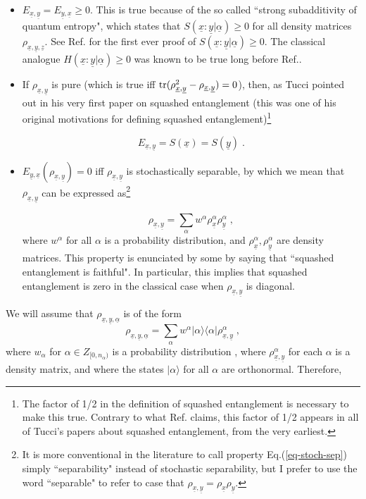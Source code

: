 \documentclass[12pt]{article}%
\newcommand{\bra}[1]{\langle#1|}
\newcommand{\ket}[1]{|#1\rangle}
\newcommand{\tr}[0]{{\rm tr }}
\newcommand{\beq}{\begin{equation}}
\newcommand{\eeq}{\end{equation}}
\newcommand{\ul}[1]{\underline{#1}}
\newcommand{\rvx}[0]{{\ul{x}}}
\newcommand{\rvy}[0]{{\ul{y}}}
\newcommand{\rvz}[0]{{\ul{z}}}
\newcommand{\rvalp}[0]{{\ul{\alpha}}}
\newcommand{\alp}[0]{{\alpha}}
\begin{document}
\begin{itemize}
\item
$E_{\rvx, \rvy} = E_{\rvy, \rvx}\geq 0$. This is true
because of the so called ``strong subadditivity
of quantum entropy", which states that
$S(\rvx : \rvy|\rvalp)\geq 0$
for all density matrices
$\rho_{\rvx,\rvy, \rvz}$.
See Ref.\cite{subadd-proof}
for the first ever proof of $S(\rvx : \rvy|\rvalp)\geq 0$.
The classical analogue $H(\rvx : \rvy|\rvalp)\geq 0$
was known to be true long before Ref.\cite{subadd-proof}.

\item
If $\rho_{\rvx, \rvy}$ is pure (which is true iff
$\tr( \rho_{\rvx, \rvy}^2 - \rho_{\rvx, \rvy}) = 0$), then, as
Tucci pointed out in his very first paper on squashed entanglement 
(this was one of his original motivations
for defining squashed entanglement)\footnote{ The factor of 1/2 in
the definition of squashed entanglement
is necessary to make this true.
Contrary to what Ref.\cite{sep-proof2} claims,
this factor
of 1/2 appears in all of Tucci's
 papers about squashed entanglement,
from the very earliest.}

\beq
E_{\rvx, \rvy} = S(\rvx) = S(\rvy)
\;.
\eeq

\item
$E_{\rvy, \rvx}(\rho_{\rvx, \rvy})= 0$ iff
$\rho_{\rvx, \rvy}$
is stochastically separable,
by which we mean that $\rho_{\rvx, \rvy}$
can be expressed as\footnote{
It is more conventional in the literature to call
property Eq.(\ref{eq-stoch-sep})
simply ``separability" instead of stochastic
separability, but I prefer to use the word
``separable" to refer to case that
$\rho_{\rvx,\rvy} = \rho_\rvx \rho_\rvy$.}

\beq
\rho_{\rvx,\rvy}= \sum_\alp w^\alp
\rho^\alp_\rvx \rho^\alp_\rvy
\;,
\label{eq-stoch-sep}
\eeq
where $w^\alp$ for all $\alp$
is a probability distribution,
and $\rho_\rvx^\alp, \rho_\rvy^\alp$
are density matrices.
This property is enunciated by some by saying that
``squashed entanglement is faithful".
In particular,
this implies that squashed entanglement
is zero
in the classical case when
$\rho_{\rvx,\rvy}$ is diagonal.


\end{itemize}

We will assume that $\rho_{\rvx, \rvy, \rvalp}$
is of the form
\beq
\rho_{\rvx, \rvy, \rvalp} =
\sum_\alp w^\alp \ket{\alp}\bra{\alp} \rho_{\rvx, \rvy}^\alp
\;,
\eeq
where $w_\alp$ for $\alp\in Z_{[0, n_\alp)}$
is a probability distribution
, where $\rho^\alp_{\rvx, \rvy}$
for each $\alp$ is a density matrix,
and where the states $\ket{\alp}$
for all $\alp$ are orthonormal.
Therefore,
\end{document}
